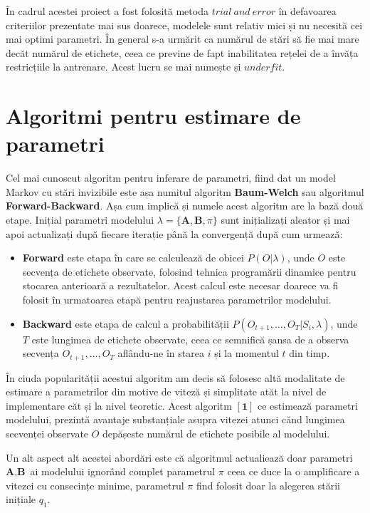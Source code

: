 În cadrul acestei proiect a fost folosită metoda $trial\ and\ error$ în defavoarea criteriilor prezentate mai sus doarece, modelele sunt relativ mici și nu necesită cei mai optimi parametri. În general s-a urmărit ca numărul de stări să fie mai mare decăt numărul de etichete, ceea ce previne de fapt inabilitatea rețelei de a învăța restricțiile la antrenare. Acest lucru se mai numește și $underfit$.\par

\section{Algoritmi pentru estimare de parametri}

Cel mai cunoscut algoritm pentru inferare de parametri, fiind dat un model Markov cu stări invizibile este așa numitul algoritm \textbf{Baum-Welch} sau algoritmul \textbf{Forward-Backward}. Așa cum implică și numele acest algoritm are la bază două etape. Inițial parametri modelului $\lambda = \{\textbf{A},\textbf{B},\pi\}$ sunt inițializați aleator și mai apoi actualizați după fiecare iterație până la convergență după cum urmează:
\begin{itemize}
\item{\textbf{Forward} este etapa în care se calculează de obicei $P(O|\lambda)$, unde $O$ este secvența de etichete observate, folosind tehnica programării dinamice pentru stocarea anterioară a rezultatelor. Acest calcul este necesar doarece va fi folosit în urmatoarea etapă pentru reajustarea parametrilor modelului.}
\item{\textbf{Backward} este etapa de calcul a probabilității $P(O_{t+1},\dots,O_{T}| S_{i},\lambda)$, unde $T$ este lungimea de etichete observate, ceea ce semnifică șansa de a observa secvența $O_{t+1},\dots,O_{T}$ aflându-ne în starea $i$ și la momentul $t$ din timp}.
\end{itemize}
\par

În ciuda popularității acestui algoritm am decis să folosesc altă modalitate de estimare a parametrilor din motive de viteză și simplitate atăt la nivel de implementare căt și la nivel teoretic. Acest algoritm ${\mathbf{[1]}}$ ce estimează parametri modelului, prezintă avantaje substanțiale asupra vitezei atunci cănd lungimea secvenței observate $O$ depășeste numărul de etichete posibile al modelului.\par

Un alt aspect alt acestei abordări este că algoritmul actualiează doar parametri $\textbf{A},\textbf{B}$ ai modelului ignorând complet parametrul $\pi$ ceea ce duce la o amplificare a vitezei cu consecințe minime, parametrul $\pi$ find folosit doar la alegerea stării inițiale $q_{1}$.\par

